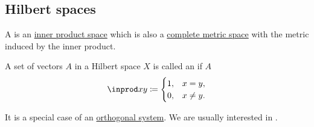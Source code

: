 \subsection{Hilbert spaces}\label{subsec:hilbert_spaces}

\begin{definition}\label{def:hilbert_space}
  A  is an \hyperref[def:inner_product_space]{inner product space} which is also a \hyperref[def:complete_metric_space]{complete metric space} with the metric induced by the inner product.
\end{definition}

\begin{definition}\label{def:orthonormal_system}
  A set of vectors \( A \) in a Hilbert space \( X \) is called an  if \( A \)
  \begin{equation*}
    \inprod x y \coloneqq \begin{cases}
      1, & x = y,    \\
      0, & x \neq y.
    \end{cases}
  \end{equation*}

  It is a special case of an \hyperref[def:orthogonality]{orthogonal system}. We are usually interested in .
\end{definition}
